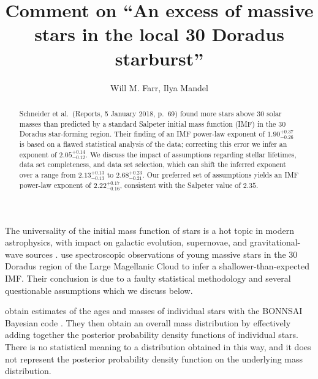 \documentclass[apjl]{emulateapj}
\newcommand{\onesigrange}[3]{\ensuremath{#1^{+#2}_{-#3}}}
\newcommand{\alpharangeone}{\onesigrange{2.05}{0.14}{0.12}}
\newcommand{\alpharangetwo}{\onesigrange{2.13}{0.13}{0.13}}
\newcommand{\alpharangethree}{\onesigrange{2.22}{0.17}{0.16}}
\newcommand{\alpharangefour}{\onesigrange{2.68}{0.23}{0.21}}
\begin{document}
\title{Comment on ``An excess of massive stars in the local 30 Doradus starburst''}

\author{Will M. Farr, Ilya Mandel}

\begin{abstract}
Schneider et al.~(Reports, 5 January 2018, p.~69) found more stars above 30 solar masses than predicted by a standard Salpeter initial mass function (IMF) in the 30 Doradus star-forming region.  Their finding of an IMF power-law exponent of $1.90^{+0.37}_{-0.26}$ is based on a flawed statistical analysis of the data; correcting this error we infer an exponent of $\alpharangeone$.  We discuss the impact of assumptions regarding stellar lifetimes, data set completeness, and data set selection, which can shift the inferred exponent over a range from $\alpharangetwo$ to $\alpharangefour$.  Our
preferred set of assumptions yields an IMF power-law exponent of  $\alpharangethree$, consistent with the Salpeter value of $2.35$.
\end{abstract}

\maketitle

The universality of the initial mass function of stars is a hot topic in modern astrophysics, with impact on galactic evolution, supernovae, and gravitational-wave sources \citep{Kroupa:2002,Bastian:2010,deMinkBelczynski:2015}.    \citet{Schneider:2018} use spectroscopic observations of young massive stars in the 30 Doradus region of the Large Magellanic Cloud to infer a shallower-than-expected IMF.  Their conclusion is due to a faulty statistical methodology and several questionable assumptions which we discuss below.

\citet{Schneider:2018} obtain estimates of the ages and masses of individual stars with the BONNSAI Bayesian code \citep{Schneider:2017}.  They then obtain an overall mass distribution by effectively adding together the posterior probability density functions of individual stars.  There is no statistical meaning to a distribution obtained in this way, and it does not represent the posterior probability density function on the underlying mass distribution.  %
\end{document}
